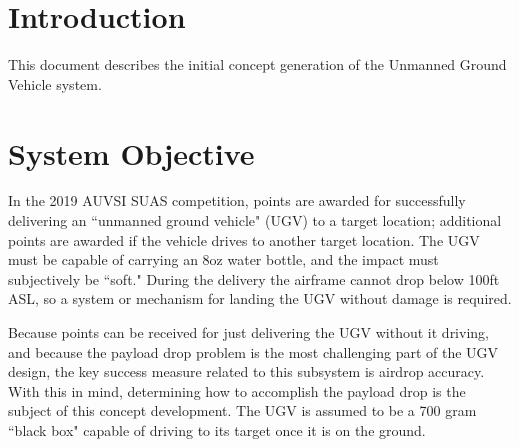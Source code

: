 \documentclass[]{auvsi_doc}
\begin{document}
\begin{AUVSITitlePage}
\begin{artifacttable}
\end{artifacttable}
\end{AUVSITitlePage}

\section{Introduction}
This document describes the initial concept generation of the Unmanned Ground Vehicle system.

\section{System Objective}
In the 2019 AUVSI SUAS competition, points are awarded for successfully delivering an ``unmanned ground vehicle" (UGV) to a target location; additional points are awarded if the vehicle drives to another target location. 
The UGV must be capable of carrying an 8oz water bottle, and the impact must subjectively be ``soft."
During the delivery the airframe cannot drop below 100ft ASL, so a system or mechanism for landing the UGV without damage is required.

Because points can be received for just delivering the UGV without it driving, and because the payload drop problem is the most challenging part of the UGV design, the key success measure related to this subsystem is airdrop accuracy. 
With this in mind, determining how to accomplish the payload drop is the subject of this concept development. 
The UGV is assumed to be a 700 gram ``black box" capable of driving to its target once it is on the ground.
\end{document}

